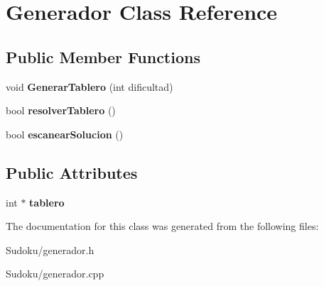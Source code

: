 \hypertarget{class_generador}{\section{Generador Class Reference}
\label{class_generador}
}
\subsection*{Public Member Functions}
\begin{DoxyCompactItemize}
\item 
\hypertarget{class_generador_ab67862d2f13c1e9b18b29b385bf5a20e}{void {\bfseries Generar\-Tablero} (int dificultad)}\label{class_generador_ab67862d2f13c1e9b18b29b385bf5a20e}

\item 
\hypertarget{class_generador_a430dccdbfe57088212912c30259f8757}{bool {\bfseries resolver\-Tablero} ()}\label{class_generador_a430dccdbfe57088212912c30259f8757}

\item 
\hypertarget{class_generador_a0e8bb058054de56ece51fc880a23fd07}{bool {\bfseries escanear\-Solucion} ()}\label{class_generador_a0e8bb058054de56ece51fc880a23fd07}

\end{DoxyCompactItemize}
\subsection*{Public Attributes}
\begin{DoxyCompactItemize}
\item 
\hypertarget{class_generador_ab990ce2cbce0dcf52b0ed827545e0b16}{int $\ast$ {\bfseries tablero}}\label{class_generador_ab990ce2cbce0dcf52b0ed827545e0b16}

\end{DoxyCompactItemize}


The documentation for this class was generated from the following files\-:\begin{DoxyCompactItemize}
\item 
Sudoku/generador.\-h\item 
Sudoku/generador.\-cpp\end{DoxyCompactItemize}
